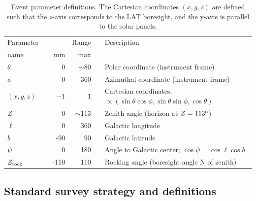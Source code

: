 \documentclass[aps,twocolumn,prd,superscriptaddress,showpacs,nofootinbib,fixfloat]{revtex4}
\newcommand{\degree}{^{\rm o}}
\newcommand{\zrock}{$Z_{\rm rock}$}
\begin{document}
\begin{table}
  \begin{center}
    \begin{tabular}{lcrrcl}
      \hline
      Parameter &\hphantom{i}& & Range &\hphantom{i}&  Description\\
      name      && min & max &&            \\
      \hline
      $\theta$ &&    0 &  $\sim80$ && Polar coordinate (instrument frame) \\
      $\phi$   &&    0 &       360 && Azimuthal coordinate (instrument frame) \\
      $(x,y,z)$&&  $-1$& $1$ && Cartesian coordinates;
      $\propto(\sin\theta\cos\phi, \sin\theta\sin\phi, \cos\theta)$\\
      $Z$      &&    0 & $\sim113$ && Zenith angle (horizon at $Z=113\degree$) \\
      $\ell$   &&    0 & 360 && Galactic longitude \\
      $b$      &&  -90 &  90 && Galactic latitude \\
      $\psi$   &&    0 & 180 && Angle to Galactic center; $\cos\psi=\cos\ell\cos b$ \\
      \zrock\  && -110 & 110 && Rocking angle (boresight angle N of zenith) \\
      \hline
    \end{tabular}
    \caption{Event parameter definitions. The Cartesian coordinates $(x, y, z)$ are
    defined such that the $z$-axis corresponds to the LAT boresight, and the
    y-axis is parallel to the solar panels.}
    \label{tab:parameters}
  \end{center}
\end{table}

\subsection{Standard survey strategy and definitions}
\label{sec:conventions}





\end{document}
